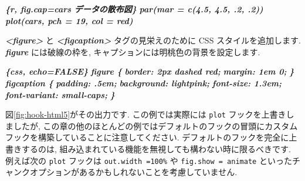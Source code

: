 \documentclass[
  11pt,
  lualatex,
  ja=standard]{bxjsreport}
\newenvironment{Shaded}{\begin{snugshade}}{\end{snugshade}}
\newcommand{\InformationTok}[1]{\textcolor[rgb]{0.56,0.35,0.01}{\textbf{\textit{#1}}}}
\newcommand{\NormalTok}[1]{#1}
\begin{document}
\begin{Shaded}
\begin{Highlighting}[]
\InformationTok{\textasciigrave{}\textasciigrave{}\textasciigrave{}\{r, fig.cap=\textquotesingle{}cars データの散布図\textquotesingle{}\}}
\InformationTok{par(mar = c(4.5, 4.5, .2, .2))}
\InformationTok{plot(cars, pch = 19, col = \textquotesingle{}red\textquotesingle{})}
\InformationTok{\textasciigrave{}\textasciigrave{}\textasciigrave{}}

\InformationTok{\textasciigrave{}\textless{}figure\textgreater{}\textasciigrave{}}\NormalTok{ と }\InformationTok{\textasciigrave{}\textless{}figcaption\textgreater{}\textasciigrave{}}\NormalTok{ タグの見栄えのために CSS スタイルを追加します. }\InformationTok{\textasciigrave{}figure\textasciigrave{}}\NormalTok{ には破線の枠を, キャプションには明桃色の背景を設定します.}

\InformationTok{\textasciigrave{}\textasciigrave{}\textasciigrave{}\{css, echo=FALSE\}}
\InformationTok{figure \{}
\InformationTok{  border: 2px dashed red;}
\InformationTok{  margin: 1em 0;}
\InformationTok{\}}
\InformationTok{figcaption \{}
\InformationTok{  padding: .5em;}
\InformationTok{  background: lightpink;}
\InformationTok{  font{-}size: 1.3em;}
\InformationTok{  font{-}variant: small{-}caps;}
\InformationTok{\}}
\InformationTok{\textasciigrave{}\textasciigrave{}\textasciigrave{}}
\end{Highlighting}
\end{Shaded}

図\ref{fig:hook-html5}がその出力です. この例では実際には \texttt{plot} フックを上書きしましたが, この章の他のほとんどの例ではデフォルトのフックの冒頭にカスタムフックを構築していることに注意してください. デフォルトのフックを完全に上書きするのは, 組み込まれている機能を無視しても構わない時に限るべきです. 例えば次の \texttt{plot} フックは \texttt{out.width =\textquotesingle{}100\%\textquotesingle{}} や \texttt{fig.show = \textquotesingle{}animate\textquotesingle{}} といったチャンクオプションがあるかもしれないことを考慮していません.
\end{document}

